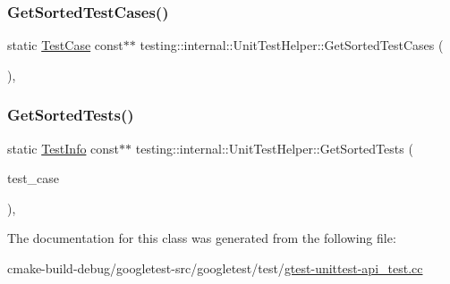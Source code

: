 \mbox{\label{classtesting_1_1internal_1_1UnitTestHelper_a9a549307062083d10358638af272cc98}} 
\subsubsection{\texorpdfstring{GetSortedTestCases()}{GetSortedTestCases()}}
{\footnotesize\ttfamily static \mbox{\hyperlink{classtesting_1_1TestCase}{Test\+Case}} const$\ast$$\ast$ testing\+::internal\+::\+Unit\+Test\+Helper\+::\+Get\+Sorted\+Test\+Cases (\begin{DoxyParamCaption}{ }\end{DoxyParamCaption})\hspace{0.3cm}{\ttfamily [inline]}, {\ttfamily [static]}}

\mbox{\label{classtesting_1_1internal_1_1UnitTestHelper_a02602d22fb74566dad78c0c9d4f24e78}} 
\subsubsection{\texorpdfstring{GetSortedTests()}{GetSortedTests()}}
{\footnotesize\ttfamily static \mbox{\hyperlink{classtesting_1_1TestInfo}{Test\+Info}} const$\ast$$\ast$ testing\+::internal\+::\+Unit\+Test\+Helper\+::\+Get\+Sorted\+Tests (\begin{DoxyParamCaption}\item[{const \mbox{\hyperlink{classtesting_1_1TestCase}{Test\+Case}} $\ast$}]{test\+\_\+case }\end{DoxyParamCaption})\hspace{0.3cm}{\ttfamily [inline]}, {\ttfamily [static]}}



The documentation for this class was generated from the following file\+:\begin{DoxyCompactItemize}
\item 
cmake-\/build-\/debug/googletest-\/src/googletest/test/\mbox{\hyperlink{gtest-unittest-api__test_8cc}{gtest-\/unittest-\/api\+\_\+test.\+cc}}\end{DoxyCompactItemize}
